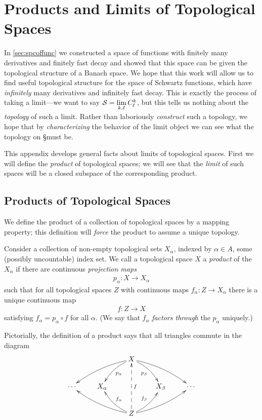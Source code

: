 
  \appendix
  \chapter{Products and Limits of Topological Spaces}
    \label{ch:topprod}

    In \cref{sec:spcoffunc} we constructed a space of functions with finitely many derivatives and finitely fast decay and showed that this space can be given the topological structure of a Banach space.
    We hope that this work will allow us to find useful topological structure for the space of Schwartz functions, which have \emph{infinitely} many derivatives and infinitely fast decay.
    This is exactly the process of taking a limit---we want to say $\S=\lim\limits_{k,\ell}C^k_\ell$, but this tells us nothing about the \emph{topology} of such a limit.
    Rather than laboriously \emph{construct} such a topology, we hope that by \emph{characterizing} the behavior of the limit object we can see what the topology on \S must be.

    This appendix develops general facts about limits of topological spaces.
    First we will define the \emph{product} of topological spaces; we will see that the \emph{limit} of such spaces will be a closed subspace of the corresponding product.

    \section{Products of Topological Spaces}
    We define the product of a collection of topological spaces by a mapping property; this definition will \emph{force} the product to assume a unique topology.
      \begin{defn}
        Consider a collection of non-empty topological sets $X_\alpha$, indexed by $\alpha\in A$, some (possibly uncountable) index set.
        We call a topological space $X$ a \emph{product} of the $X_\alpha$ if there are continuous \emph{projection maps} 
        \begin{align*}
          p_\alpha:X\longrightarrow X_\alpha
        \end{align*}
        such that for all topological spaces $Z$ with continuous maps $f_\alpha:Z\rightarrow X_\alpha$ there is a unique continuous map 
        \begin{align*}
          f:Z\longrightarrow X
        \end{align*}
        satisfying $f_\alpha=p_\alpha\circ f$ for all $\alpha$.
        (We say that $f_\alpha$ \emph{factors through} the $p_\alpha$ uniquely.)
      \end{defn}
      Pictorially, the definition of a product says that all triangles commute in the diagram
      \begin{displaymath}
        \xymatrix{
          && X \ar@/_/[dll] \ar@/_/[dl]^{p_\alpha} \ar@/^/[dr]_{p_\beta} \ar@/^/[drr] \\
          \cdots & X_\alpha && X_\beta & \cdots\\
          && Z \ar@/^/[ull] \ar@/^/[ul]_{f_\alpha} \ar@{-->}[uu]_f \ar@/_/[ur]^{f_\beta} \ar@/_/[urr]
         }
      \end{displaymath}

